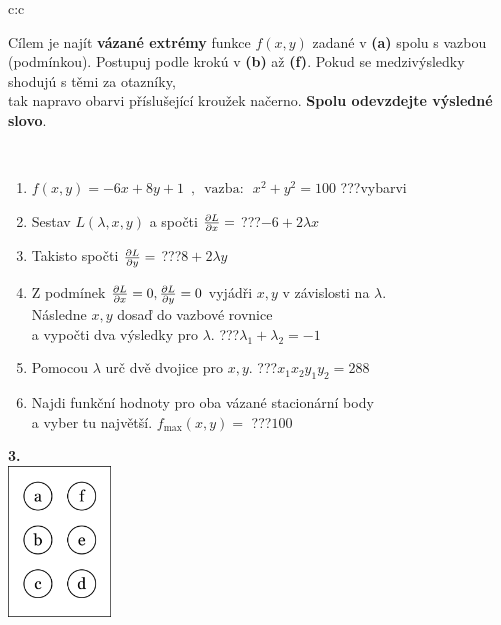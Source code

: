\documentclass[10pt]{report}
\begin{document}
\begin{tabular}{c:c}
\begin{minipage}[c][104.5mm][t]{0.5\linewidth}
\begin{center}
\begin{minipage}{0.95\linewidth}
\begin{center}
Cílem je najít \textbf{vázané extrémy} funkce $f(x,y)$ zadané v \textbf{(a)} spolu s vazbou (podmínkou). Postupuj podle krokú v \textbf{(b)} až \textbf{(f)}. Pokud se medzivýsledky shodujú s těmi za otazníky,\\tak napravo obarvi příslušející kroužek načerno. \textbf{Spolu odevzdejte výsledné slovo}.
\end{center}
\end{minipage}
\\[1mm]
\begin{minipage}{0.79\linewidth}
\begin{center}
\begin{varwidth}{\linewidth}
\begin{enumerate}
\normalsize
\item $f(x,y)=-6x+8y+1 \enspace , \enspace \mathrm{vazba:} \enspace x^2+y^2=100$\quad \dotfill\; ???\;\dotfill \quad vybarvi
\item Sestav $L(\lambda,x,y)$ a spočti $\pdv{L}{x}=$\quad \dotfill\; ???\;\dotfill \quad $-6+2\lambda x$
\item Takisto spočti $\pdv{L}{y}=$\quad \dotfill\; ???\;\dotfill \quad $8+2\lambda y$
\item Z podmínek $\pdv{L}{x}=0 , \pdv{L}{y}=0$ vyjádři $x,y$ v závislosti na $\lambda$.\\ \phantom{xxxxxx}Následne $x,y$ dosaď do vazbové rovnice\\ \phantom{xxxxxx}a vypočti dva výsledky pro $\lambda$.\quad \dotfill\; ???\;\dotfill \quad $\lambda_1+\lambda_2=-1$
\item Pomocou $\lambda$ urč dvě dvojice pro $x,y$.\quad \dotfill\; ???\;\dotfill \quad $x_1 x_2 y_1 y_2=288$
\item Najdi funkční hodnoty pro oba vázané stacionární body\\ \phantom{xxxxxx}a vyber tu najvětší. $f_{\text{max}}(x,y)=$\quad \dotfill\; ???\;\dotfill \quad $100$
\end{enumerate}
\end{varwidth}
\end{center}
\end{minipage}
\begin{minipage}{0.20\linewidth}
\begin{center}
{\Huge\bfseries 3.} \\[2mm]
\includegraphics[height=40mm]{../images/braille.png}

\end{center}
\end{minipage}
\end{center}
\end{minipage}
\end{tabular}
\end{document}
